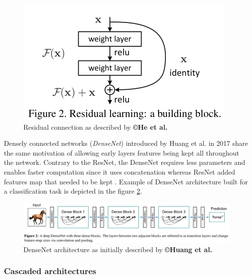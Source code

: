 \begin{figure}[th!]
	\centering
	\includegraphics[width=0.4\linewidth]{images/image6}
	\caption{Residual connection as described by \textbf{©He et al. \cite{He2015}}}
	\label{ResidualConnection_Fig}
\end{figure}

Densely connected networks (\emph{DenseNet}) introduced by Huang
et al. \cite{Huang2017} in 2017 share the same motivation of allowing early layers
features being kept all throughout the network. Contrary to the ResNet,
the DenseNet requires less parameters and enables faster computation
since it uses concatenation whereas ResNet added features map that
needed to be kept \cite{Huang2017}. Example of DenseNet
architecture built for a classification task is depicted in the figure \ref{DenseNet_Fig}.
\begin{figure}[th!]
	\centering
	\includegraphics[width=0.9\linewidth]{images/image32}
	\caption{DenseNet architecture as initially described by \textbf{©Huang et al. \cite{Huang2017}}}
	\label{DenseNet_Fig}
\end{figure}


\subsubsection{Cascaded architectures}

